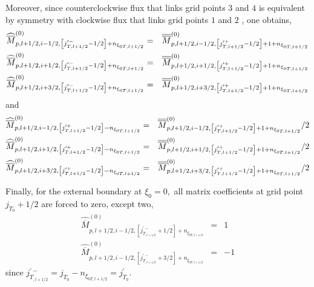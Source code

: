 Moreover, since counterclockwise flux that links grid points $3$ and $4$ is
equivalent by symmetry with clockwise flux that links grid points $1$ and $2$
, one obtains,
\begin{eqnarray}
\widehat{\overline{M}}_{p,l+1/2,i-1/2,\left[ j_{T,l+1/2}^{\prime
-}-1/2\right] +n_{\xi _{0T,l+1/2}}}^{\left( 0\right) } &=&\overline{%
\overline{M}}_{p,l+1/2,i-1/2,\left[ j_{T,l+1/2}^{\prime +}-1/2\right]
+1+n_{\xi _{0T,l+1/2}}}^{\left( 0\right) }  \nonumber \\
\widehat{\overline{M}}_{p,l+1/2,i+1/2,\left[ j_{T,l+1/2}^{\prime
-}-1/2\right] +n_{\xi _{0T,l+1/2}}}^{\left( 0\right) } &=&\overline{%
\overline{M}}_{p,l+1/2,i+1/2,\left[ j_{T,l+1/2}^{\prime +}-1/2\right]
+1+n_{\xi _{0T,l+1/2}}}^{\left( 0\right) }\nonumber\\
\widehat{\overline{M}}_{p,l+1/2,i+3/2,\left[ j_{T,l+1/2}^{\prime
-}-1/2\right] +n_{\xi _{0T,l+1/2}}}^{\left( 0\right) } &=&\overline{%
\overline{M}}_{p,l+1/2,i+3/2,\left[ j_{T,l+1/2}^{\prime +}-1/2\right]
+1+n_{\xi _{0T,l+1/2}}}^{\left( 0\right) }  \nonumber\\
\end{eqnarray}
and
\begin{eqnarray}
\widehat{\overline{M}}_{p,l+1/2,i-1/2,\left[ j_{T,l+1/2}^{\prime
+}-1/2\right] -n_{\xi _{0T,l+1/2}}}^{\left( 0\right) } &=&\overline{%
\overline{M}}_{p,l+1/2,i-1/2,\left[ j_{T,l+1/2}^{\prime +}-1/2\right]
+1+n_{\xi _{0T,l+1/2}}}^{\left( 0\right) }/2  \nonumber \\
\widehat{\overline{M}}_{p,l+1/2,i+1/2,\left[ j_{T,l+1/2}^{\prime
+}-1/2\right] -n_{\xi _{0T,l+1/2}}}^{\left( 0\right) } &=&\overline{%
\overline{M}}_{p,l+1/2,i+1/2,\left[ j_{T,l+1/2}^{\prime +}-1/2\right]
+1+n_{\xi _{0T,l+1/2}}}^{\left( 0\right) }/2 \nonumber\\
\widehat{\overline{M}}_{p,l+1/2,i+3/2,\left[ j_{T,l+1/2}^{\prime
+}-1/2\right] -n_{\xi _{0T,l+1/2}}}^{\left( 0\right) } &=&\overline{%
\overline{M}}_{p,l+1/2,i+3/2,\left[ j_{T,l+1/2}^{\prime +}-1/2\right]
+1+n_{\xi _{0T,l+1/2}}}^{\left( 0\right) }/2  \nonumber\\
\end{eqnarray}

Finally, for the external boundary at $\xi _{0}=0,$ all matrix coefficients
at grid point $j_{T_{0}}+1/2$ are forced to zero, except two,
\begin{eqnarray}
\widehat{\overline{M}}_{p,l+1/2,i-1/2,\left[ j_{T_{,l+1/2}}^{\prime
-}+1/2\right] +n_{\xi _{0T,l+1/2}}}^{\left( 0\right) } &=&1  \nonumber \\
\widehat{\overline{M}}_{p,l+1/2,i-1/2,\left[ j_{T_{,l+1/2}}^{\prime
-}+3/2\right] +n_{\xi _{0T,l+1/2}}}^{\left( 0\right) } &=&-1
\end{eqnarray}
since $j_{T_{,l+1/2}}^{\prime -}=j_{T_{0}}-n_{\xi
_{0T,l+1/2}}=j_{T_{0}}^{\prime }.$

